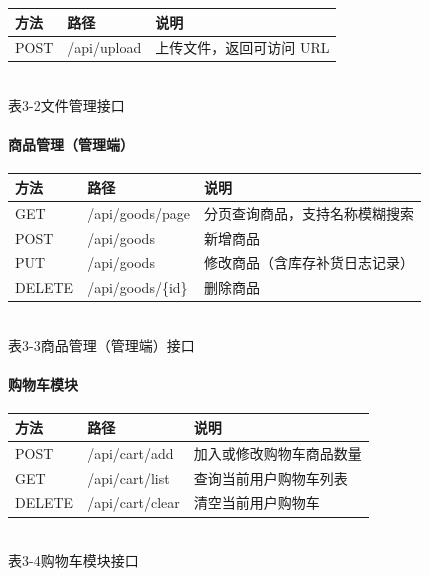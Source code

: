 \begin{center}
  \renewcommand{\arraystretch}{1.4}
  \begin{tabular}{|>{\centering\arraybackslash}m{1.5cm}|>{\centering\arraybackslash}m{5.2cm}|>{\centering\arraybackslash}m{6.0cm}|}
    \hline
    \textbf{方法} & \textbf{路径} & \textbf{说明}    \\ \hline
    POST        & /api/upload & 上传文件，返回可访问 URL \\ \hline
  \end{tabular}
  \\[0.3em]
  {表3-2\quad 文件管理接口}
\end{center}

\paragraph{商品管理（管理端）}

\begin{center}
  \renewcommand{\arraystretch}{1.4}
  \begin{tabular}{|>{\centering\arraybackslash}m{1.5cm}|>{\centering\arraybackslash}m{5.2cm}|>{\centering\arraybackslash}m{6.0cm}|}
    \hline
    \textbf{方法} & \textbf{路径}       & \textbf{说明}     \\ \hline
    GET         & /api/goods/page   & 分页查询商品，支持名称模糊搜索 \\ \hline
    POST        & /api/goods        & 新增商品            \\ \hline
    PUT         & /api/goods        & 修改商品（含库存补货日志记录） \\ \hline
    DELETE      & /api/goods/\{id\} & 删除商品            \\ \hline
  \end{tabular}
  \\[0.3em]
  {表3-3\quad 商品管理（管理端）接口}
\end{center}

\paragraph{购物车模块}

\begin{center}
  \renewcommand{\arraystretch}{1.4}
  \begin{tabular}{|>{\centering\arraybackslash}m{1.5cm}|>{\centering\arraybackslash}m{5.2cm}|>{\centering\arraybackslash}m{6.0cm}|}
    \hline
    \textbf{方法} & \textbf{路径}     & \textbf{说明}  \\ \hline
    POST        & /api/cart/add   & 加入或修改购物车商品数量 \\ \hline
    GET         & /api/cart/list  & 查询当前用户购物车列表  \\ \hline
    DELETE      & /api/cart/clear & 清空当前用户购物车    \\ \hline
  \end{tabular}
  \\[0.3em]
  {表3-4\quad 购物车模块接口}
\end{center}

